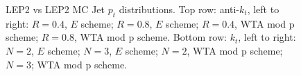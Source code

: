 \begin{figure}[H]
\hfill
{}\hfill
{}\hfill
\caption{LEP2 vs LEP2 MC Jet $p_t$ distributions. Top row: anti-$k_t$, left to right: $R=0.4$, $E$ scheme; $R=0.8$, $E$ scheme; $R=0.4$, WTA mod p scheme; $R=0.8$, WTA mod p scheme. Bottom row: $k_t$, left to right: $N=2$, $E$ scheme; $N=3$, $E$ scheme; $N=2$, WTA mod p scheme; $N=3$; WTA mod p scheme.}  
\end{figure}

